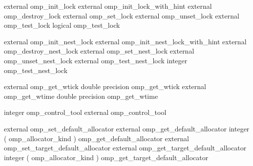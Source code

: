 {\begin{codepar}
     external omp\_init\_lock
     external omp\_init\_lock\_with\_hint
     external omp\_destroy\_lock
     external omp\_set\_lock
     external omp\_unset\_lock
     external omp\_test\_lock
     logical omp\_test\_lock

     external omp\_init\_nest\_lock
     external omp\_init\_nest\_lock\_with\_hint
     external omp\_destroy\_nest\_lock
     external omp\_set\_nest\_lock
     external omp\_unset\_nest\_lock
     external omp\_test\_nest\_lock
     integer omp\_test\_nest\_lock

     external omp\_get\_wtick
     double precision omp\_get\_wtick
     external omp\_get\_wtime
     double precision omp\_get\_wtime

     integer  omp\_control\_tool
     external omp\_control\_tool

     external omp\_set\_default\_allocator
     external omp\_get\_default\_allocator
     integer ( omp\_allocator\_kind ) omp\_get\_default\_allocator
     external omp\_set\_target\_default\_allocator
     external omp\_get\_target\_default\_allocator
     integer ( omp\_allocator\_kind ) omp\_get\_target\_default\_allocator

\end{codepar}}





\pagebreak
